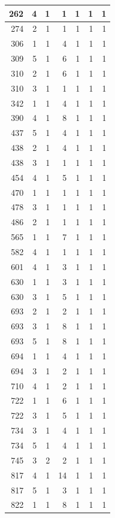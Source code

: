 \documentclass[11pt,]{book}
\begin{document}
\begin{table}
\begin{tabular}[t]{r|r|r|r|r|r|r}
262 & 4 & 1 & 1 & 1 & 1 & 1\\
\hline
274 & 2 & 1 & 1 & 1 & 1 & 1\\
\hline
306 & 1 & 1 & 4 & 1 & 1 & 1\\
\hline
309 & 5 & 1 & 6 & 1 & 1 & 1\\
\hline
310 & 2 & 1 & 6 & 1 & 1 & 1\\
\hline
310 & 3 & 1 & 1 & 1 & 1 & 1\\
\hline
342 & 1 & 1 & 4 & 1 & 1 & 1\\
\hline
390 & 4 & 1 & 8 & 1 & 1 & 1\\
\hline
437 & 5 & 1 & 4 & 1 & 1 & 1\\
\hline
438 & 2 & 1 & 4 & 1 & 1 & 1\\
\hline
438 & 3 & 1 & 1 & 1 & 1 & 1\\
\hline
454 & 4 & 1 & 5 & 1 & 1 & 1\\
\hline
470 & 1 & 1 & 1 & 1 & 1 & 1\\
\hline
478 & 3 & 1 & 1 & 1 & 1 & 1\\
\hline
486 & 2 & 1 & 1 & 1 & 1 & 1\\
\hline
565 & 1 & 1 & 7 & 1 & 1 & 1\\
\hline
582 & 4 & 1 & 1 & 1 & 1 & 1\\
\hline
601 & 4 & 1 & 3 & 1 & 1 & 1\\
\hline
630 & 1 & 1 & 3 & 1 & 1 & 1\\
\hline
630 & 3 & 1 & 5 & 1 & 1 & 1\\
\hline
693 & 2 & 1 & 2 & 1 & 1 & 1\\
\hline
693 & 3 & 1 & 8 & 1 & 1 & 1\\
\hline
693 & 5 & 1 & 8 & 1 & 1 & 1\\
\hline
694 & 1 & 1 & 4 & 1 & 1 & 1\\
\hline
694 & 3 & 1 & 2 & 1 & 1 & 1\\
\hline
710 & 4 & 1 & 2 & 1 & 1 & 1\\
\hline
722 & 1 & 1 & 6 & 1 & 1 & 1\\
\hline
722 & 3 & 1 & 5 & 1 & 1 & 1\\
\hline
734 & 3 & 1 & 4 & 1 & 1 & 1\\
\hline
734 & 5 & 1 & 4 & 1 & 1 & 1\\
\hline
745 & 3 & 2 & 2 & 1 & 1 & 1\\
\hline
817 & 4 & 1 & 14 & 1 & 1 & 1\\
\hline
817 & 5 & 1 & 3 & 1 & 1 & 1\\
\hline
822 & 1 & 1 & 8 & 1 & 1 & 1\\

\end{tabular}
\end{table}
\end{document}
